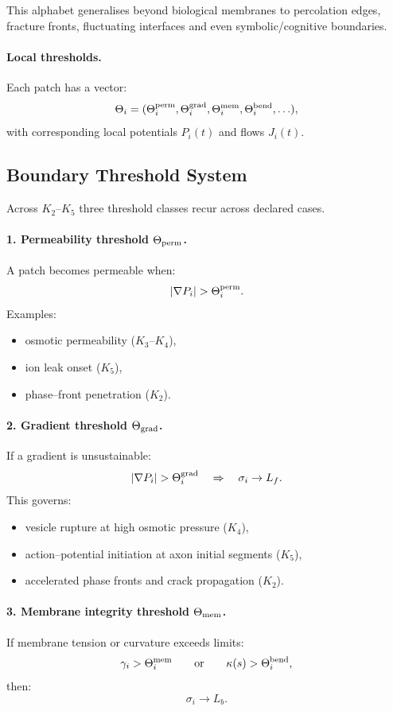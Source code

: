 This alphabet generalises beyond biological membranes to percolation edges,
fracture fronts, fluctuating interfaces and even symbolic/cognitive boundaries.

\paragraph{Local thresholds.}
Each patch has a vector:
\[
  \Theta_i = (\Theta^{\rm perm}_i, \Theta^{\rm grad}_i, \Theta^{\rm mem}_i,
              \Theta^{\rm bend}_i, \ldots ),
\]
with corresponding local potentials \(P_i(t)\) and flows \(J_i(t)\).

\subsection{Boundary Threshold System}

Across \(K_2\)--\(K_5\) three threshold classes recur across declared cases.

\paragraph{1. Permeability threshold \(\Theta_{\rm perm}\).}
A patch becomes permeable when:
\[
  |\nabla P_i| > \Theta^{\rm perm}_i.
\]
Examples:
\begin{itemize}
    \item osmotic permeability (\(K_3\)--\(K_4\)),
    \item ion leak onset (\(K_5\)),
    \item phase–front penetration (\(K_2\)).
\end{itemize}

\paragraph{2. Gradient threshold \(\Theta_{\rm grad}\).}
If a gradient is unsustainable:
\[
  |\nabla P_i| > \Theta^{\rm grad}_i
  \quad\Rightarrow\quad \sigma_i \to L_f.
\]
This governs:
\begin{itemize}
    \item vesicle rupture at high osmotic pressure (\(K_4\)),
    \item action–potential initiation at axon initial segments (\(K_5\)),
    \item accelerated phase fronts and crack propagation (\(K_2\)).
\end{itemize}

\paragraph{3. Membrane integrity threshold \(\Theta_{\rm mem}\).}
If membrane tension or curvature exceeds limits:
\[
  \gamma_i > \Theta^{\rm mem}_i
  \qquad\text{or}\qquad
  \kappa(s) > \Theta^{\rm bend}_i,
\]
then:
\[
  \sigma_i \to L_b.
\]

